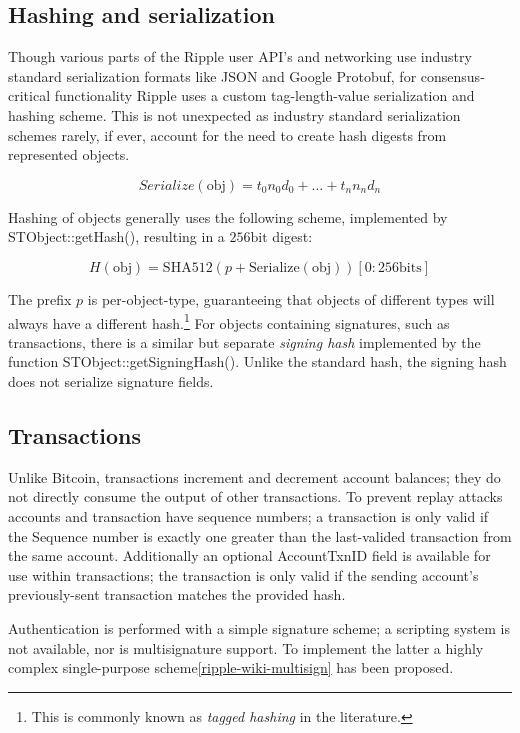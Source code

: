 \documentclass{article}
\begin{document}
\subsection{Hashing and serialization}

Though various parts of the Ripple user API's and networking use industry
standard serialization formats like JSON and Google Protobuf, for
consensus-critical functionality Ripple uses a custom tag-length-value
serialization and hashing scheme. This is not unexpected as industry standard
serialization schemes rarely, if ever, account for the need to create hash
digests from represented objects.

\begin{equation}
    \textit{Serialize}(\text{obj}) = t_0 n_0 d_0 + \hdots + t_n n_n d_n
\end{equation}

Hashing of objects generally uses the following scheme, implemented by
STObject::getHash(), resulting in a $256\text{bit}$ digest:

\begin{equation}
    H(\text{obj}) = \text{SHA512}(p + \text{Serialize}(\text{obj}))[0:256\text{bits}]
\end{equation}

The prefix $p$ is per-object-type, guaranteeing that objects of different types
will always have a different hash.\footnote{This is commonly known as
\emph{tagged hashing} in the literature.} For objects containing signatures,
such as transactions, there is a similar but separate \emph{signing hash}
implemented by the function STObject::getSigningHash(). Unlike the standard
hash, the signing hash does not serialize signature fields.


\subsection{Transactions}

Unlike Bitcoin, transactions increment and decrement account balances; they do
not directly consume the output of other transactions. To prevent replay
attacks accounts and transaction have sequence numbers; a transaction is only
valid if the Sequence number is exactly one greater than the last-valided
transaction from the same account. Additionally an optional AccountTxnID field
is available for use within transactions; the transaction is only valid if the
sending account's previously-sent transaction matches the provided hash.

Authentication is performed with a simple signature scheme; a scripting system
is not available, nor is multisignature support. To implement the latter a
highly complex single-purpose scheme\ref{ripple-wiki-multisign} has been
proposed.
\end{document}
